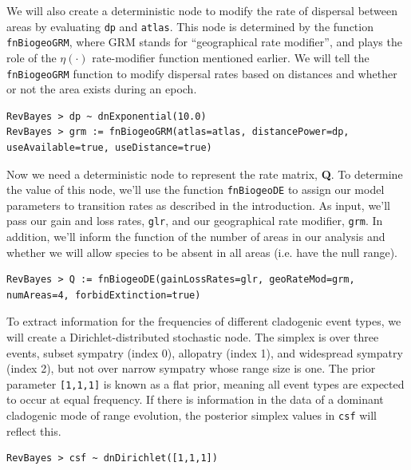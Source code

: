 We will also create a deterministic node to modify the rate of dispersal between areas by evaluating {\tt dp} and {\tt atlas}.
This node is determined by the function {\tt fnBiogeoGRM}, where GRM stands for ``geographical rate modifier'', and plays the role of the $\eta(\cdot)$ rate-modifier function mentioned earlier.
We will tell the {\tt fnBiogeoGRM} function to modify dispersal rates based on distances and whether or not the area exists during an epoch.

\begin{snugshade}
\begin{lstlisting}
RevBayes > dp ~ dnExponential(10.0)
RevBayes > grm := fnBiogeoGRM(atlas=atlas, distancePower=dp, useAvailable=true, useDistance=true)
\end{lstlisting}
\end{snugshade}

Now we need a deterministic node to represent the rate matrix, {\bf Q}.
To determine the value of this node, we'll use the function {\tt fnBiogeoDE} to assign our model parameters to transition rates as described in the introduction.
As input, we'll pass our gain and loss rates, {\tt glr}, and our geographical rate modifier, {\tt grm}.
In addition, we'll inform the function of the number of areas in our analysis and whether we will allow species to be absent in all areas (i.e. have the null range).

\begin{snugshade}
\begin{lstlisting}
RevBayes > Q := fnBiogeoDE(gainLossRates=glr, geoRateMod=grm, numAreas=4, forbidExtinction=true)
\end{lstlisting}
\end{snugshade}

To extract information for the frequencies of different cladogenic event types, we will create a Dirichlet-distributed stochastic node.
The simplex is over three events, subset sympatry (index 0), allopatry (index 1), and widespread sympatry (index 2), but not over narrow sympatry whose range size is one.
The prior parameter {\tt [1,1,1]} is known as a flat prior, meaning all event types are expected to occur at equal frequency.
If there is information in the data of a dominant cladogenic mode of range evolution, the posterior simplex values in {\tt csf} will reflect this.

\begin{snugshade}
\begin{lstlisting}
RevBayes > csf ~ dnDirichlet([1,1,1])
\end{lstlisting}
\end{snugshade}

